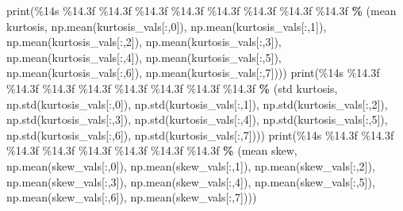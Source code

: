 \documentclass[
]{book}
\newenvironment{Shaded}{\begin{snugshade}}{\end{snugshade}}
\newcommand{\BuiltInTok}[1]{#1}
\newcommand{\DecValTok}[1]{\textcolor[rgb]{0.00,0.00,0.81}{#1}}
\newcommand{\NormalTok}[1]{#1}
\newcommand{\OperatorTok}[1]{\textcolor[rgb]{0.81,0.36,0.00}{\textbf{#1}}}
\newcommand{\SpecialCharTok}[1]{\textcolor[rgb]{0.00,0.00,0.00}{#1}}
\newcommand{\StringTok}[1]{\textcolor[rgb]{0.31,0.60,0.02}{#1}}
\begin{document}
\begin{Shaded}
\begin{Highlighting}[]
  \BuiltInTok{print}\NormalTok{(}\StringTok{\textquotesingle{}}\SpecialCharTok{\%14s}\StringTok{ }\SpecialCharTok{\%14.3f}\StringTok{ }\SpecialCharTok{\%14.3f}\StringTok{ }\SpecialCharTok{\%14.3f}\StringTok{ }\SpecialCharTok{\%14.3f}\StringTok{ }\SpecialCharTok{\%14.3f}\StringTok{ }\SpecialCharTok{\%14.3f}\StringTok{ }\SpecialCharTok{\%14.3f}\StringTok{ }\SpecialCharTok{\%14.3f}\StringTok{\textquotesingle{}} \OperatorTok{\%}\NormalTok{ (}\StringTok{\textquotesingle{}mean kurtosis\textquotesingle{}}\NormalTok{, np.mean(kurtosis\_vals[:,}\DecValTok{0}\NormalTok{]), np.mean(kurtosis\_vals[:,}\DecValTok{1}\NormalTok{]), np.mean(kurtosis\_vals[:,}\DecValTok{2}\NormalTok{]), np.mean(kurtosis\_vals[:,}\DecValTok{3}\NormalTok{]), np.mean(kurtosis\_vals[:,}\DecValTok{4}\NormalTok{]), np.mean(kurtosis\_vals[:,}\DecValTok{5}\NormalTok{]), np.mean(kurtosis\_vals[:,}\DecValTok{6}\NormalTok{]), np.mean(kurtosis\_vals[:,}\DecValTok{7}\NormalTok{])))}
  \BuiltInTok{print}\NormalTok{(}\StringTok{\textquotesingle{}}\SpecialCharTok{\%14s}\StringTok{ }\SpecialCharTok{\%14.3f}\StringTok{ }\SpecialCharTok{\%14.3f}\StringTok{ }\SpecialCharTok{\%14.3f}\StringTok{ }\SpecialCharTok{\%14.3f}\StringTok{ }\SpecialCharTok{\%14.3f}\StringTok{ }\SpecialCharTok{\%14.3f}\StringTok{ }\SpecialCharTok{\%14.3f}\StringTok{ }\SpecialCharTok{\%14.3f}\StringTok{\textquotesingle{}} \OperatorTok{\%}\NormalTok{ (}\StringTok{\textquotesingle{}std kurtosis\textquotesingle{}}\NormalTok{, np.std(kurtosis\_vals[:,}\DecValTok{0}\NormalTok{]), np.std(kurtosis\_vals[:,}\DecValTok{1}\NormalTok{]), np.std(kurtosis\_vals[:,}\DecValTok{2}\NormalTok{]), np.std(kurtosis\_vals[:,}\DecValTok{3}\NormalTok{]), np.std(kurtosis\_vals[:,}\DecValTok{4}\NormalTok{]), np.std(kurtosis\_vals[:,}\DecValTok{5}\NormalTok{]), np.std(kurtosis\_vals[:,}\DecValTok{6}\NormalTok{]), np.std(kurtosis\_vals[:,}\DecValTok{7}\NormalTok{])))}
  \BuiltInTok{print}\NormalTok{(}\StringTok{\textquotesingle{}}\SpecialCharTok{\%14s}\StringTok{ }\SpecialCharTok{\%14.3f}\StringTok{ }\SpecialCharTok{\%14.3f}\StringTok{ }\SpecialCharTok{\%14.3f}\StringTok{ }\SpecialCharTok{\%14.3f}\StringTok{ }\SpecialCharTok{\%14.3f}\StringTok{ }\SpecialCharTok{\%14.3f}\StringTok{ }\SpecialCharTok{\%14.3f}\StringTok{ }\SpecialCharTok{\%14.3f}\StringTok{\textquotesingle{}} \OperatorTok{\%}\NormalTok{ (}\StringTok{\textquotesingle{}mean skew\textquotesingle{}}\NormalTok{, np.mean(skew\_vals[:,}\DecValTok{0}\NormalTok{]), np.mean(skew\_vals[:,}\DecValTok{1}\NormalTok{]), np.mean(skew\_vals[:,}\DecValTok{2}\NormalTok{]), np.mean(skew\_vals[:,}\DecValTok{3}\NormalTok{]), np.mean(skew\_vals[:,}\DecValTok{4}\NormalTok{]), np.mean(skew\_vals[:,}\DecValTok{5}\NormalTok{]), np.mean(skew\_vals[:,}\DecValTok{6}\NormalTok{]), np.mean(skew\_vals[:,}\DecValTok{7}\NormalTok{])))}

\end{Highlighting}
\end{Shaded}
\end{document}
